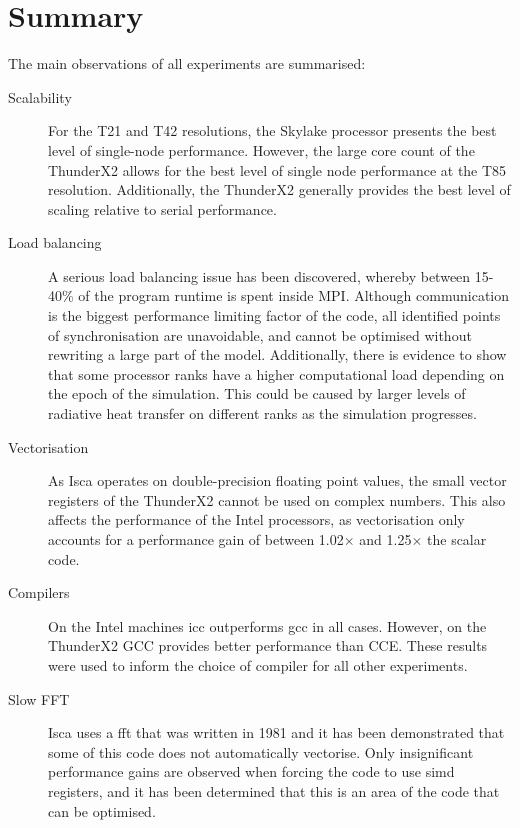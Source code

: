 \documentclass[a4paper,11pt]{report}
\begin{document}
\section{Summary}
The main observations of all experiments are summarised:
\begin{description}

	\item[Scalability] For the T21 and T42 resolutions, the Skylake processor presents the best level of single-node performance. However, the large core count of the ThunderX2 allows for the best level of single node performance at the T85 resolution. Additionally, the ThunderX2 generally provides the best level of scaling relative to serial performance.

	\item[Load balancing] A serious load balancing issue has been discovered, whereby between 15-40\% of the program runtime is spent inside MPI. Although communication is the biggest performance limiting factor of the code, all identified points of synchronisation are unavoidable, and cannot be optimised without rewriting a large part of the model. Additionally, there is evidence to show that some processor ranks have a higher computational load depending on the epoch of the simulation. This could be caused by larger levels of radiative heat transfer on different ranks as the simulation progresses.
	
	\item[Vectorisation] As Isca operates on double-precision floating point values, the small vector registers of the ThunderX2 cannot be used on complex numbers. This also affects the performance of the Intel processors, as vectorisation only accounts for a performance gain of between 1.02$\times$ and 1.25$\times$ the scalar code. 
	
	\item[Compilers] On the Intel machines \gls{icc} outperforms \gls{gcc} in all cases. However, on the ThunderX2 GCC provides better performance than CCE. These results were used to inform the choice of compiler for all other experiments. 
	
	\item[Slow FFT] Isca uses a \gls{fft} that was written in 1981 and it has been demonstrated that some of this code does not automatically vectorise. Only insignificant performance gains are observed when forcing the code to use \gls{simd} registers, and it has been determined that this is an area of the code that can be optimised. 
	
	
\end{description}
\end{document}
